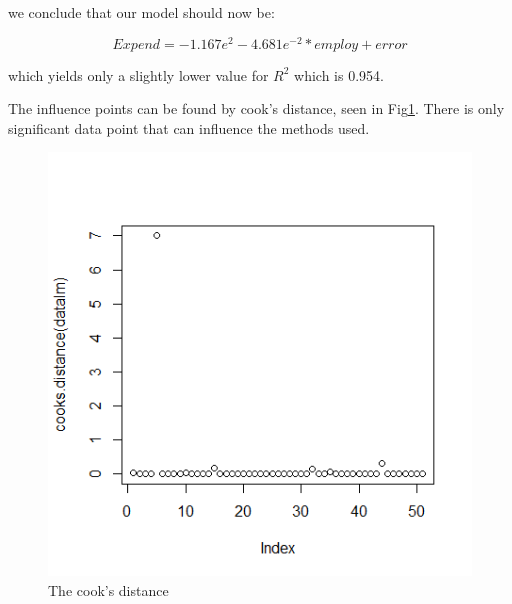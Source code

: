 \documentclass{article}
\begin{document}
	we conclude that our model should now be:
	
	$$Expend = -1.167e^{2} - 4.681e^{-2}*employ + error$$
	
	which yields only a slightly lower value for $R^2$ which is 0.954.
    
    The influence points can be found by cook's distance, seen in Fig\ref{fig:4cook}.
    There is only significant data point that can influence the methods used.
    \begin{figure}[H]
        \centering
        \includegraphics[scale=0.4]{../results/4_cook.png}
        \caption{The cook's distance}
        \label{fig:4cook}
    \end{figure}
\end{document}
